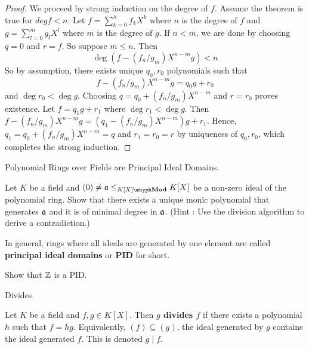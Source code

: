 \documentclass[../../book.tex]{subfiles}
\begin{document}
\begin{proof}
    We proceed by strong induction on the degree of $f$. 
    Assume the theorem is true for $deg f < n$.
    Let $f = \sum_{k = 0}^{n} f_k X^k$ where $n$ is the degree of $f$
    and $g = \sum_{l = 0}^m g_l X^l$ where $m$ is the degree of $g$. 
    If $n < m$, we are done by choosing $q = 0$ and $r = f$.
    So suppose $m \leq n$. 
    Then \[
        \deg (f - (f_n/g_m)X^{n-m} g) < n
    \]
    So by assumption, there exists unique $q_0, r_0$ polynomials such that 
    \[f - (f_n/g_m)X^{n-m} g = q_0 g + r_0\] and $\deg r_0 < \deg g$. 
    Choosing $q = q_0 + (f_n/g_m)X^{n-m}$ and $r = r_0$ proves existence.
    Let $f = q_1 g + r_1$ where $\deg r_1 < \deg g$. 
    Then $f - (f_n/g_m)X^{n-m}g = (q_1 - (f_n/g_m)X^{n-m}) g + r_1$.
    Hence, $q_1 = q_0 + (f_n/g_m)X^{n-m} = q$ 
    and $r_1 = r_0 = r$ by uniqueness of $q_0, r_0$,
    which completes the strong induction. 
\end{proof}

\begin{ex} Polynomial Rings over Fields are Principal Ideal Domains. 
    
    Let $K$ be a field and $(0) \neq \fa \leq_{\mod{K[X]}} K[X]$ be a non-zero ideal 
    of the polynomial ring. 
    Show that there exists a unique monic polynomial that generates $\mathfrak{a}$
    and it is of minimal degree in $\mathfrak{a}$. 
    (Hint : Use the division algorithm to derive a contradiction.)
    
    In general, rings where all ideals are generated by one element
    are called \textbf{principal ideal domains} or \textbf{PID} for short.
\end{ex}
\begin{ex}
    Show that $\mathbb{Z}$ is a PID. 
\end{ex}
\begin{dfn} Divides.
    
    Let $K$ be a field and $f, g \in K[X]$.
    Then \textbf{$g$ divides $f$} if there exists a polynomial $h$
    such that $f = hg$. 
    Equivalently, $(f) \subseteq (g)$,
    the ideal generated by $g$ contains the ideal generated $f$.
    This is denoted $g \mid f$. 
\end{dfn}
\end{document}
